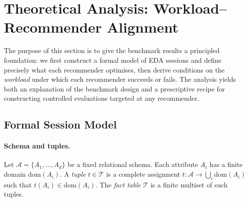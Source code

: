 \section{Theoretical Analysis: Workload--Recommender Alignment}
\label{sec:theory}

The purpose of this section is to give the benchmark results a principled
foundation: we first construct a formal
model of EDA sessions and define precisely what each recommender optimises, then
derive conditions on the \emph{workload} under which each recommender succeeds
or fails.  The analysis yields both an explanation of the benchmark design and a
prescriptive recipe for constructing controlled evaluations targeted at any
recommender.

\subsection{Formal Session Model}
\label{sec:theory:model}

\paragraph{Schema and tuples.}
Let $\mathcal{A} = \{A_1, \ldots, A_d\}$ be a fixed relational schema.  Each
attribute $A_i$ has a finite domain $\text{dom}(A_i)$.  A \emph{tuple}
$t \in \mathcal{T}$ is a complete assignment $t : \mathcal{A} \to
\bigcup_i \text{dom}(A_i)$ such that $t(A_i) \in \text{dom}(A_i)$.  The
\emph{fact table} $\mathcal{T}$ is a finite multiset of such tuples.

